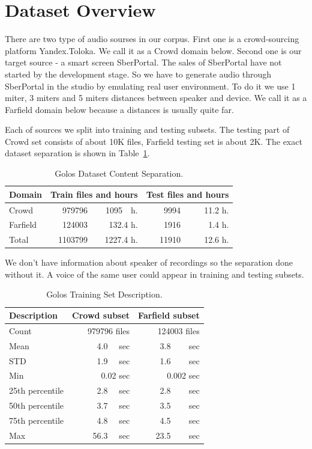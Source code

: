 \documentclass[a4paper]{article}
\begin{document}
\section{Dataset Overview}

There are two type of audio sourses in our corpus. First one is a crowd-sourcing platform Yandex.Toloka. We call it as a Crowd domain below. Second one is our target source - a smart screen SberPortal. The sales of SberPortal have not started by the development stage. So we have to generate audio through SberPortal in the studio by emulating real user environment. To do it we use 1 miter, 3 miters and 5 miters distances between speaker and device. We call it as a Farfield domain below because a distances is usually quite far.

Each of sources we split into training and testing subsets. The testing part of Crowd set consists of about 10K files, Farfield testing set is about 2K. The exact dataset separation is shown in Table~\ref{tab:dataset_separation}. 

\begin{table}[th]
  \caption{Golos Dataset Content Separation.}
  \label{tab:dataset_separation}
  \centering
  \begin{tabular}{ l|r|r|r|r }
    \toprule
    \multicolumn{1}{l|}{\textbf{Domain}} & \multicolumn{2}{c|}{\textbf{Train files and hours}} & \multicolumn{2}{c}{\textbf{Test files and hours}} \\
    \midrule
    Crowd  & 979796 & 1095~~h.  & 9994 & 11.2 h. \\
    Farfield & 124003 & 132.4 h. &  1916 & 1.4 h. \\
    \bottomrule
    Total  & 1103799 & 1227.4 h. & 11910 & 12.6 h. \\
  \end{tabular}
\end{table}

We don't have information about speaker of recordings so the separation done without it. A voice of the same user could appear in training and testing subsets. 


\begin{table}[t]
  \caption{Golos Training Set Description.}
  \label{tab:dataset_description}
  \centering
  \begin{tabular}{lrr}
    \toprule
    \textbf{Description}      & \textbf{Crowd  subset}     & \textbf{Farfield subset} \\
    \midrule
    Count & 979796 files & 124003 files \\
    Mean & 4.0~~ sec & 3.8 ~~~ sec \\
    STD &  1.9~~ sec & 1.6 ~~~ sec \\
    Min & 0.02 sec & 0.002 sec \\
    25th percentile& 2.8~~ sec & 2.8 ~~~ sec \\
    50th percentile& 3.7~~ sec & 3.5 ~~~ sec \\
    75th percentile& 4.8~~ sec & 4.5 ~~~ sec \\
    Max & 56.3~~ sec & 23.5 ~~~ sec \\
    \bottomrule
  \end{tabular}
\end{table}
\end{document}
